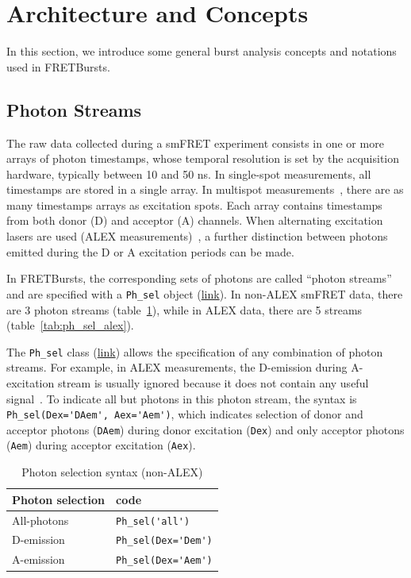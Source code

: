 \documentclass[10pt,letterpaper]{article}
\begin{document}
\section*{Architecture and Concepts}
\label{sec:concepts}

In this section, we introduce some general burst analysis concepts
and notations used in FRETBursts.

\subsection*{Photon Streams}
\label{sec:ph_streams}

The raw data collected during a smFRET experiment consists in one or more arrays of
photon timestamps, whose temporal resolution is set by the acquisition hardware,
typically between 10 and 50 ns.
In single-spot measurements, all timestamps are stored in a single array. In multispot
measurements~\cite{Ingargiola_2013}, there are as many timestamps arrays
as excitation spots.
Each array contains timestamps from both donor (D) and acceptor (A) channels.
When alternating excitation lasers are used (ALEX measurements)~\cite{Lee_2005},
a further distinction between photons emitted during the D or A excitation periods can be made.

In FRETBursts, the corresponding sets of photons are called ``photon streams'' and are
specified with a \verb|Ph_sel| object
(\href{http://fretbursts.readthedocs.org/en/latest/ph_sel.html}{link}).
In non-ALEX smFRET data, there are 3 photon streams
(table~\ref{tab:ph_sel_smfret}), while in ALEX data, there are 5 streams (table~\ref{tab:ph_sel_alex}).

The \verb|Ph_sel| class (\href{http://fretbursts.readthedocs.org/en/latest/ph_sel.html}{link})
allows the specification of any combination of photon streams.
For example, in ALEX measurements, the D-emission during A-excitation stream is
usually ignored because it does not contain any useful signal~\cite{Lee_2005}.
To indicate all but photons in this photon stream, the syntax is
\verb|Ph_sel(Dex='DAem', Aex='Aem')|, which indicates selection of donor
and acceptor photons (\verb|DAem|) during donor excitation (\verb|Dex|) and only acceptor
photons (\verb|Aem|) during acceptor excitation (\verb|Aex|).

\begin{table}
\begin{tabular}{l|l}
  Photon selection  & code \\
  \hline
  All-photons       & \verb|Ph_sel('all')|\\
  D-emission    & \verb|Ph_sel(Dex='Dem')|\\
  A-emission & \verb|Ph_sel(Dex='Aem')|\\
\end{tabular}
\caption{\label{tab:ph_sel_smfret}Photon selection syntax (non-ALEX)}
\end{table}
\end{document}
